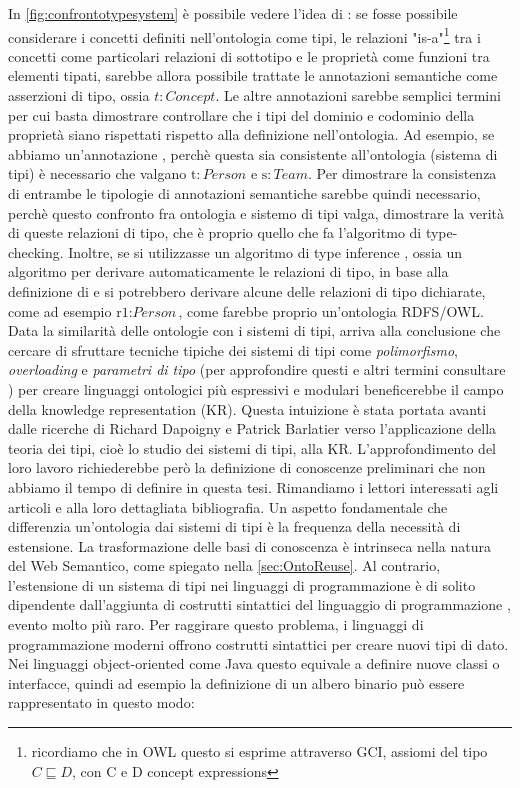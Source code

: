 In \autoref{fig:confrontotypesystem} è possibile vedere l'idea di \cite{despeyroux2008evolution}: se fosse possibile considerare i concetti definiti nell'ontologia come tipi, le relazioni "is-a"\footnote{ricordiamo che in OWL questo si esprime attraverso GCI, assiomi del tipo $C \sqsubseteq D$, con C e D concept expressions} tra i concetti come particolari relazioni di sottotipo e le proprietà come funzioni tra elementi tipati, sarebbe allora possibile trattate le annotazioni semantiche  come asserzioni di tipo, ossia $t : \textit{Concept}$. Le altre annotazioni sarebbe semplici termini per cui basta dimostrare controllare che i tipi del dominio e codominio della proprietà siano rispettati rispetto alla definizione nell'ontologia. Ad esempio, se abbiamo un'annotazione , perchè questa sia consistente all'ontologia (sistema di tipi) è necessario che valgano $\text{t}: Person$ e $\text{s}: Team$. Per dimostrare la consistenza di entrambe le tipologie di annotazioni semantiche sarebbe quindi necessario, perchè questo confronto fra ontologia e sistemo di tipi valga, dimostrare la verità di queste relazioni di tipo, che è proprio quello che fa l'algoritmo di type-checking. Inoltre, se si utilizzasse un algoritmo di type inference \cite{cardoneTypeInference, martellimontanaritypeinference}, ossia un algoritmo per derivare automaticamente le  relazioni di tipo, in base alla definizione di  e  si potrebbero derivare alcune delle relazioni di tipo dichiarate, come ad esempio $\text{r1} : \textit{Person}$, come farebbe proprio un'ontologia RDFS/OWL.\\
Data la similarità delle ontologie con i sistemi di tipi, \cite{despeyroux2008evolution} arriva alla conclusione che cercare di sfruttare tecniche tipiche dei sistemi di tipi come \textit{polimorfismo}, \textit{overloading} e \textit{parametri di tipo} (per approfondire questi e altri termini consultare \cite{pierceTypesBook}) per creare linguaggi ontologici più espressivi e modulari beneficerebbe il campo della knowledge representation (KR). Questa intuizione è stata portata avanti dalle ricerche di Richard Dapoigny e Patrick Barlatier verso l'applicazione della teoria dei tipi, cioè lo studio dei sistemi di tipi, alla KR. L'approfondimento del loro lavoro richiederebbe però la definizione di conoscenze preliminari che non abbiamo il tempo di definire in questa tesi. Rimandiamo i lettori interessati agli articoli \cite{dapoigny2011typetheoryKR, dapoigny2012typetheoryKR} e alla loro dettagliata bibliografia.
Un aspetto fondamentale che differenzia un'ontologia dai sistemi di tipi è la frequenza della necessità di estensione. La trasformazione delle basi di conoscenza è intrinseca nella natura del Web Semantico, come spiegato nella \autoref{sec:OntoReuse}. Al contrario, l'estensione di un sistema di tipi nei linguaggi di programmazione è di solito dipendente dall'aggiunta di costrutti sintattici del linguaggio di programmazione \cite{pierceTypesBook}, evento molto più raro. Per raggirare questo problema, i linguaggi di programmazione moderni offrono costrutti sintattici per creare nuovi tipi di dato. Nei linguaggi object-oriented come Java questo equivale a definire nuove classi o interfacce, quindi ad esempio la definizione di un albero binario può essere rappresentato in questo modo:
